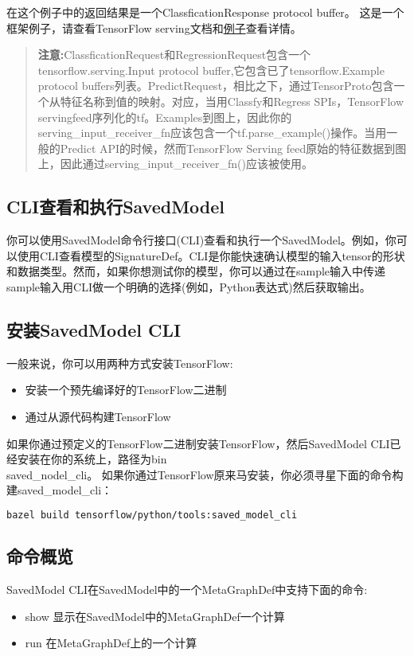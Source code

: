 在这个例子中的返回结果是一个ClassficationResponse protocol buffer。
这是一个框架例子，请查看TensorFlow serving文档和\href{https://github.com/tensorflow/serving/tree/master/tensorflow_serving/example}{例子}查看详情。
\begin{quote}
\textbf{注意:}ClassficationRequest和RegressionRequest包含一个tensorflow.serving.Input protocol buffer,它包含已了tensorflow.Example protocol buffers列表。PredictRequest，相比之下，通过TensorProto包含一个从特征名称到值的映射。对应，当用Classfy和Regress SPIs，TensorFlow servingfeed序列化的tf。Examples到图上，因此你的serving\_input\_receiver\_fn应该包含一个tf.parse\_example()操作。当用一般的Predict API的时候，然而TensorFlow Serving feed原始的特征数据到图上，因此通过serving\_input\_receiver\_fn()应该被使用。
\end{quote}
\subsection{CLI查看和执行SavedModel}
你可以使用SavedModel命令行接口(CLI)查看和执行一个SavedModel。例如，你可以使用CLI查看模型的SignatureDef。CLI是你能快速确认模型的输入tensor的形状和数据类型。然而，如果你想测试你的模型，你可以通过在sample输入中传递sample输入用CLI做一个明确的选择(例如，Python表达式)然后获取输出。
\subsection{安装SavedModel CLI}
一般来说，你可以用两种方式安装TensorFlow:
\begin{itemize}
\item 安装一个预先编译好的TensorFlow二进制
\item 通过从源代码构建TensorFlow 
\end{itemize}
如果你通过预定义的TensorFlow二进制安装TensorFlow，然后SavedModel CLI已经安装在你的系统上，路径为bin\\saved\_nodel\_cli。
如果你通过TensorFlow原来马安装，你必须寻星下面的命令构建saved\_model\_cli：
\begin{lstlisting}[language=Bash]
bazel build tensorflow/python/tools:saved_model_cli
\end{lstlisting}
\subsection{命令概览}
SavedModel CLI在SavedModel中的一个MetaGraphDef中支持下面的命令:
\begin{itemize}
\item show 显示在SavedModel中的MetaGraphDef一个计算
\item run 在MetaGraphDef上的一个计算
\end{itemize}

